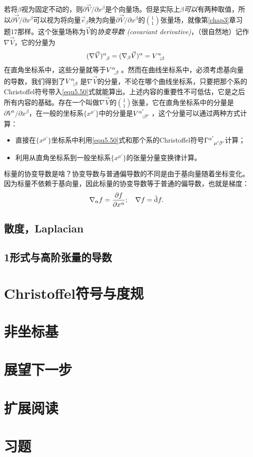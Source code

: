 若将$\beta$视为固定不动的，则$\partial \vec{V} / \partial x^\beta$是个向量场。但是实际上$\beta$\textit{可以}有两种取值，所以$\partial \vec{V} / \partial x^\beta$可以视为将向量$\vec{e}_\beta$映为向量$\partial \vec{V} / \partial x^\beta$的$\binom{1}{1}$张量场，就像第\ref{chap3}章习题17那样。这个张量场称为$\vec{V}$的\textit{协变导数 (covariant derivative)}，（很自然地）记作$\nabla \vec{V}$，它的分量为
\begin{equation}
    (\nabla \vec{V})\indices{^\alpha_\beta} = (\nabla_\beta \vec{V})\indices{^\alpha} = V\indices{^\alpha_{; \beta}} 
\label{equ5.52}
\end{equation}
在直角坐标系中，这些分量就等于$V\indices{^\alpha_{, \beta}}$。然而在曲线坐标系中，必须考虑基向量的导数，我们得到了$V\indices{^\alpha_{; \beta}}$是$\nabla \vec{V}$的分量，不论在哪个曲线坐标系，只要把那个系的Christoffel符号带入\eqref{equ5.50}式就能算出。上述内容的重要性不可低估，它是之后所有内容的基础。存在一个叫做$\nabla \vec{V}$的$\binom{1}{1}$张量，它在直角坐标系中的分量是$\partial V^\alpha / \partial x^\beta$，在一般的坐标系$\{ x^{\mu'} \}$中的分量是$V\indices{^{\alpha'}_{; \beta'}}$，这个分量可以通过两种方式计算：
\begin{itemize}
\item 直接在$\{ x^{\mu'} \}$坐标系中利用\eqref{equ5.50}式和那个系的Christoffel符号$\Gamma\indices{^{\alpha'}_{\mu' \beta'}}$计算；
\item 利用从直角坐标系到一般坐标系$\{ x^{\mu'} \}$的张量分量变换律计算。
\end{itemize}

标量的协变导数是啥？协变导数与普通偏导数的不同是由于基向量随着坐标变化。因为标量不依赖于基向量，因此标量的协变导数等于普通的偏导数，也就是梯度：
\begin{equation}
    \nabla_\alpha f = \frac{\partial f}{\partial x^\alpha}; \quad \nabla f = \tilde{\mathrm{d}} f.
\label{equ5.53}
\end{equation}


\subsection*{散度，Laplacian}

\subsection*{1形式与高阶张量的导数}

\section{Christoffel符号与度规}
\label{sec5.4}

\section{非坐标基}
\label{sec5.5}

\section{展望下一步}
\label{sec5.6}

\section{扩展阅读}
\label{sec5.7}

\section{习题}
\label{sec5.8}